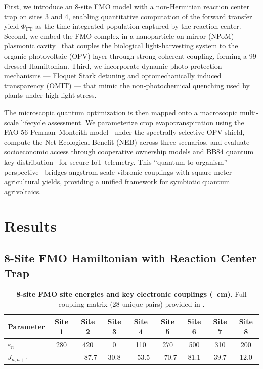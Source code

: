 \documentclass[twocolumn]{article}
\begin{document}
First, we introduce an 8-site FMO model with a non-Hermitian reaction center trap on sites 3 and 4, enabling quantitative computation of the forward transfer yield $\Phi_{\mathrm{FT}}$ as the time-integrated population captured by the reaction center.
Second, we embed the FMO complex in a nanoparticle-on-mirror (NPoM) plasmonic cavity~\cite{Chikkaraddy2016} that couples the biological light-harvesting system to the organic photovoltaic (OPV) layer through strong coherent coupling, forming a \SI{9}{\times}\SI{9}{} dressed Hamiltonian.
Third, we incorporate dynamic photo-protection mechanisms --- Floquet Stark detuning and optomechanically induced transparency (OMIT) --- that mimic the non-photochemical quenching used by plants under high light stress.

The microscopic quantum optimization is then mapped onto a macroscopic multi-scale lifecycle assessment.
We parameterize crop evapotranspiration using the FAO-56 Penman--Monteith model~\cite{Allen1998} under the spectrally selective OPV shield, compute the Net Ecological Benefit (NEB) across three scenarios, and evaluate socioeconomic access through cooperative ownership models and BB84 quantum key distribution~\cite{Bennett1984} for secure IoT telemetry.
This ``quantum-to-organism'' perspective~\cite{Vandamme2025} bridges angstrom-scale vibronic couplings with square-meter agricultural yields, providing a unified framework for symbiotic quantum agrivoltaics.


\section*{Results}

\subsection*{8-Site FMO Hamiltonian with Reaction Center Trap}

\begin{table}[htbp]
\centering
\caption{\textbf{8-site FMO site energies and key electronic couplings (\si{\per\cm})}. Full coupling matrix (28 unique pairs) provided in .}
\label{tab:fmo_parameters}
\begin{tabular}{lcccccccc}
\toprule
\textbf{Parameter} & \textbf{Site 1} & \textbf{Site 2} & \textbf{Site 3} & \textbf{Site 4} & \textbf{Site 5} & \textbf{Site 6} & \textbf{Site 7} & \textbf{Site 8} \\
\midrule
$\varepsilon_n$ & 280 & 420 & 0 & 110 & 270 & 500 & 310 & 200 \\
$J_{n,n+1}$ & --- & $-87.7$ & $30.8$ & $-53.5$ & $-70.7$ & $81.1$ & $39.7$ & $12.0$ \\
\bottomrule
\end{tabular}
\end{table}
\end{document}
